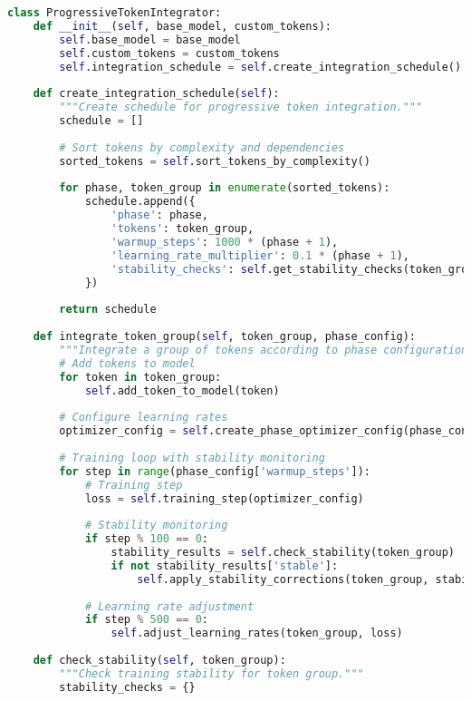 \begin{lstlisting}[language=Python, caption=Progressive custom token integration]
class ProgressiveTokenIntegrator:
    def __init__(self, base_model, custom_tokens):
        self.base_model = base_model
        self.custom_tokens = custom_tokens
        self.integration_schedule = self.create_integration_schedule()
        
    def create_integration_schedule(self):
        """Create schedule for progressive token integration."""
        schedule = []
        
        # Sort tokens by complexity and dependencies
        sorted_tokens = self.sort_tokens_by_complexity()
        
        for phase, token_group in enumerate(sorted_tokens):
            schedule.append({
                'phase': phase,
                'tokens': token_group,
                'warmup_steps': 1000 * (phase + 1),
                'learning_rate_multiplier': 0.1 * (phase + 1),
                'stability_checks': self.get_stability_checks(token_group)
            })
        
        return schedule
    
    def integrate_token_group(self, token_group, phase_config):
        """Integrate a group of tokens according to phase configuration."""
        # Add tokens to model
        for token in token_group:
            self.add_token_to_model(token)
        
        # Configure learning rates
        optimizer_config = self.create_phase_optimizer_config(phase_config)
        
        # Training loop with stability monitoring
        for step in range(phase_config['warmup_steps']):
            # Training step
            loss = self.training_step(optimizer_config)
            
            # Stability monitoring
            if step % 100 == 0:
                stability_results = self.check_stability(token_group)
                if not stability_results['stable']:
                    self.apply_stability_corrections(token_group, stability_results)
            
            # Learning rate adjustment
            if step % 500 == 0:
                self.adjust_learning_rates(token_group, loss)
    
    def check_stability(self, token_group):
        """Check training stability for token group."""
        stability_checks = {}
        

\end{lstlisting}
